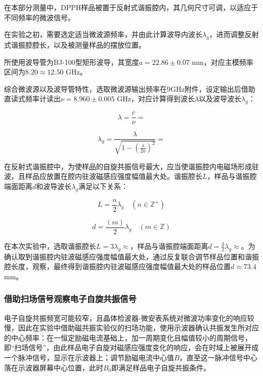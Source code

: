 \documentclass{thuemp}
\begin{document}
在本部分测量中，DPPH样品被置于反射式谐振腔内，其几何尺寸可调，以适应于不同频率的微波信号。

在实验之初，需要选定适当微波源频率，并由此计算波导内波长$\lambda_g$，进而调整反射式谐振腔腔长，以及被测量样品的摆放位置。

所使用波导管为BJ-100型矩形波导，其宽度$a=22.86\pm0.07$ \si{\milli\meter}，对应主模频率区间为$8.20 \approx 12.50$ \si{\giga\hertz}。

综合微波源以及波导管特性，选取微波源输出频率在$9$\si{\giga\hertz}附件，设定输出后借助直读式频率计读出$\nu  = 8.960 \pm 0.005$ \si{\giga\hertz}，对应计算得到波长$\lambda$以及波导波长$\lambda_g$：

\begin{equation}
\lambda = \frac{c}{\nu} = 
\end{equation}

\begin{equation}
\lambda_g = \frac{\lambda}{\sqrt{1 - \left(\frac{\lambda}{2a}\right)^2}} = 
\end{equation}

在反射式谐振腔中，为使样品的自旋共振信号最大，应当使谐振腔内电磁场形成驻波，且样品应放置在腔内驻波磁感应强度幅值最大处。谐振腔长$L$，样品与谐振腔端面距离$d$和波导波长$\lambda_g$满足以下关系：

\begin{equation}
L = \frac{n}{2}\lambda_g \quad (n \in \mathbb{Z}^+)
\end{equation}

\begin{equation}
d = \frac{(m)}{2}\lambda_g \quad (m \in \mathbb{Z})
\end{equation}

在本次实验中，选取谐振腔长$L=3\lambda_g\approx$，样品与谐振腔端面距离$d=\frac{3}{2}\lambda_g\approx$。为确认取到谐振腔内驻波磁感应强度幅值最大处，通过反复联合调节样品位置和谐振腔长度，观察，最终得到谐振腔内驻波磁感应强度幅值最大处的样品位置$d \approx 73.4 $\si{\milli\meter}。

\subsubsection{借助扫场信号观察电子自旋共振信号}

电子自旋共振频宽可能较窄，且晶体检波器-微安表系统对微波功率变化的响应较慢，因此在实验中借助磁共振实验仪的扫场功能，使用示波器确认共振发生所对应的中心频率：在一恒定励磁电流基础上，加一周期变化且幅值较小的周期信号，即“扫场信号”，由此样品电子自旋对磁感应强度变化的响应，会在时域上被展开成一个脉冲信号，显示在示波器上；调节励磁电流中心值$B$，直至这一脉冲信号中心落在示波器屏幕中心位置，此时$B_0$即满足样品电子自旋共振条件。
\end{document}
